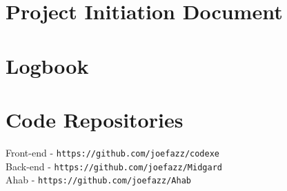 \begin{appendices}
\chapter{Project Initiation Document}


\chapter{Logbook}


\chapter{Code Repositories}
Front-end - \texttt{https://github.com/joefazz/codexe}\\
Back-end - \texttt{https://github.com/joefazz/Midgard}\\
Ahab - \texttt{https://github.com/joefazz/Ahab}
\end{appendices}
